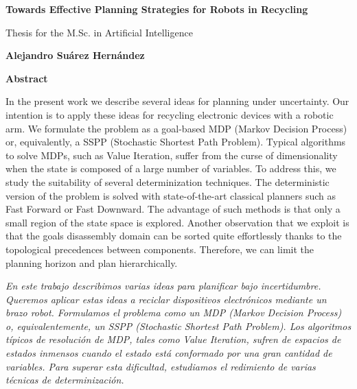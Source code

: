 \documentclass[11pt,a4paper,oldfontcommands,oneside]{memoir}
\begin{document}



\cleardoublepage


\cleardoublepage

\thispagestyle{plain}
\begin{center}
	\Large
	\textbf{Towards Effective Planning Strategies for Robots in Recycling}
	
	\vspace{0.4cm}
	\large
	Thesis for the M.Sc. in Artificial Intelligence
	
	\vspace{0.4cm}
	\textbf{Alejandro Su\'arez Hern\'andez}
	
	\vspace{0.9cm}
	\textbf{Abstract}
\end{center}

In the present work we describe several ideas for planning under 
uncertainty. Our intention is to apply these ideas for recycling
electronic devices with a robotic arm. We formulate the problem as
a goal-based MDP (Markov Decision Process) or, equivalently, a SSPP
(Stochastic Shortest Path Problem). Typical algorithms to solve MDPs,
such as Value Iteration, suffer from the curse of
dimensionality when the state is composed of a large number of
variables. To address this, we study the suitability
of several determinization techniques. The deterministic version
of the problem is solved with state-of-the-art classical planners
such as Fast Forward or
Fast Downward. The advantage of such methods is that only a small
region of the state space is explored. Another observation that we
exploit is that the goals disassembly domain can be sorted quite
effortlessly thanks to the topological precedences between components.
Therefore, we can limit the planning horizon and plan hierarchically.

\vspace{0.33cm}
\noindent
{\itshape
	En este trabajo describimos varias ideas para planificar bajo
	incertidumbre. Queremos aplicar estas ideas a reciclar
	dispositivos electrónicos mediante un brazo robot. Formulamos
	el problema como un MDP (Markov Decision Process) o, equivalentemente,
	un SSPP (Stochastic Shortest Path Problem). Los algoritmos típicos
	de resolución de MDP, tales como Value Iteration, sufren de
	espacios de estados inmensos cuando el estado está conformado
	por una gran cantidad de variables. Para superar esta dificultad,
	estudiamos el redimiento de varias técnicas de determinización.
}
\end{document}
